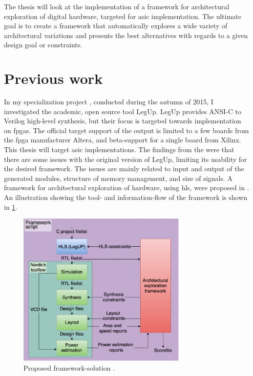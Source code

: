 The thesis will look at the implementation of a framework for architectural exploration of digital hardware, targeted for \gls{asic} implementation. The ultimate goal is to create a framework that automatically explores a wide variety of architectural variations and presents the best alternatives with regards to a given design goal or constraints.
\section{Previous work}
In my specialization project \cite{holm2015pro}, conducted during the autumn of 2015, I investigated the academic, open source tool LegUp. LegUp provides ANSI-C to Verilog high-level synthesis, but their focus is targeted towards implementation on \gls{fpga}s. The official target support of the output is limited to a few boards from the \gls{fpga} manufacturer Altera, and beta-support for a single board from Xilinx. This thesis will target \gls{asic} implementations. The findings from the \cite{holm2015pro} were that there are some issues with the original version of LegUp, limiting its usability for the desired framework. The issues are mainly related to input and output of the generated modules, structure of memory management, and size of signals. A framework for architectural exploration of hardware, using \gls{hls}, were proposed in \cite{holm2015pro}. An illustration showing the tool- and information-flow of the framework is shown in \cref{fig:frameworkflow}.

\begin{figure}[hbpt]
\centering
\includegraphics[width=0.75\textwidth]{../figs/Framework.png}
\caption{\label{fig:frameworkflow}Proposed framework-solution \cite{holm2015pro}.}
\end{figure}

